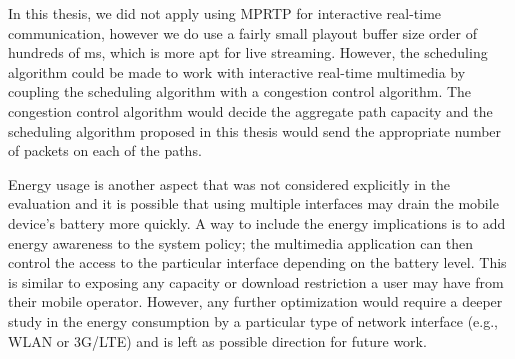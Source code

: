 In this thesis, we did not apply using MPRTP for interactive real-time
communication, however we do use a fairly small playout buffer size order of
hundreds of ms, which is more apt for live streaming. However, the scheduling
algorithm could be made to work with interactive real-time multimedia by
coupling the scheduling algorithm with a congestion control algorithm. The
congestion control algorithm would decide the aggregate path capacity and the
scheduling algorithm proposed in this thesis would send the appropriate number
of packets on each of the paths.

Energy usage is another aspect that was not considered explicitly in the
evaluation and it is possible that using multiple interfaces may drain the
mobile device's battery more quickly. A way to include the energy implications
is to add energy awareness to the system policy; the multimedia application
can then control the access to the particular interface depending on the
battery level. This is similar to exposing any capacity or download
restriction a user may have from their mobile operator. However, any further
optimization would require a deeper study in the energy consumption by a
particular type of network interface (e.g., WLAN or 3G/LTE) and is left as
possible direction for future work.

